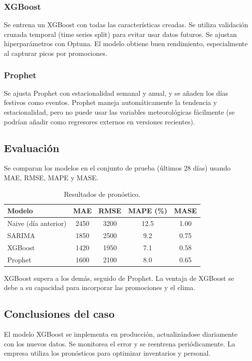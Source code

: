 \documentclass[12pt,a4paper,openany,oneside]{book}
\begin{document}
\subsubsection{XGBoost}
Se entrena un XGBoost con todas las características creadas. Se utiliza validación cruzada temporal (time series split) para evitar usar datos futuros. Se ajustan hiperparámetros con Optuna. El modelo obtiene buen rendimiento, especialmente al capturar picos por promociones.

\subsubsection{Prophet}
Se ajusta Prophet con estacionalidad semanal y anual, y se añaden los días festivos como eventos. Prophet maneja automáticamente la tendencia y estacionalidad, pero no puede usar las variables meteorológicas fácilmente (se podrían añadir como regresores externos en versiones recientes).

\subsection{Evaluación}
Se comparan los modelos en el conjunto de prueba (últimos 28 días) usando MAE, RMSE, MAPE y MASE.

\begin{table}[h]
\centering
\begin{tabular}{l|c|c|c|c}
\textbf{Modelo} & \textbf{MAE} & \textbf{RMSE} & \textbf{MAPE (\%)} & \textbf{MASE} \\
\hline
Naive (día anterior) & 2450 & 3200 & 12.5 & 1.00 \\
SARIMA & 1850 & 2500 & 9.2 & 0.75 \\
XGBoost & 1420 & 1950 & 7.1 & 0.58 \\
Prophet & 1600 & 2100 & 8.0 & 0.65 \\
\end{tabular}
\caption{Resultados de pronóstico.}
\end{table}

XGBoost supera a los demás, seguido de Prophet. La ventaja de XGBoost se debe a su capacidad para incorporar las promociones y el clima.

\subsection{Conclusiones del caso}
El modelo XGBoost se implementa en producción, actualizándose diariamente con los nuevos datos. Se monitorea el error y se reentrena periódicamente. La empresa utiliza los pronósticos para optimizar inventarios y personal.
\end{document}
